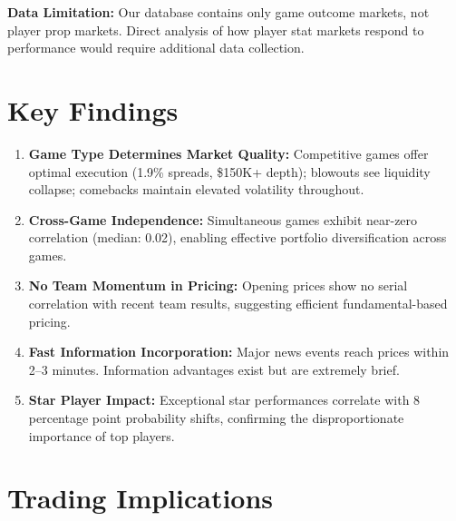 \textbf{Data Limitation:} Our database contains only game outcome markets, not player prop markets. Direct analysis of how player stat markets respond to performance would require additional data collection.

\section{Key Findings}

\begin{keyfindings}
\begin{enumerate}
    \item \textbf{Game Type Determines Market Quality:} Competitive games offer optimal execution (1.9\% spreads, \$150K+ depth); blowouts see liquidity collapse; comebacks maintain elevated volatility throughout.

    \item \textbf{Cross-Game Independence:} Simultaneous games exhibit near-zero correlation (median: 0.02), enabling effective portfolio diversification across games.

    \item \textbf{No Team Momentum in Pricing:} Opening prices show no serial correlation with recent team results, suggesting efficient fundamental-based pricing.

    \item \textbf{Fast Information Incorporation:} Major news events reach prices within 2--3 minutes. Information advantages exist but are extremely brief.

    \item \textbf{Star Player Impact:} Exceptional star performances correlate with 8 percentage point probability shifts, confirming the disproportionate importance of top players.
\end{enumerate}
\end{keyfindings}

\section{Trading Implications}

